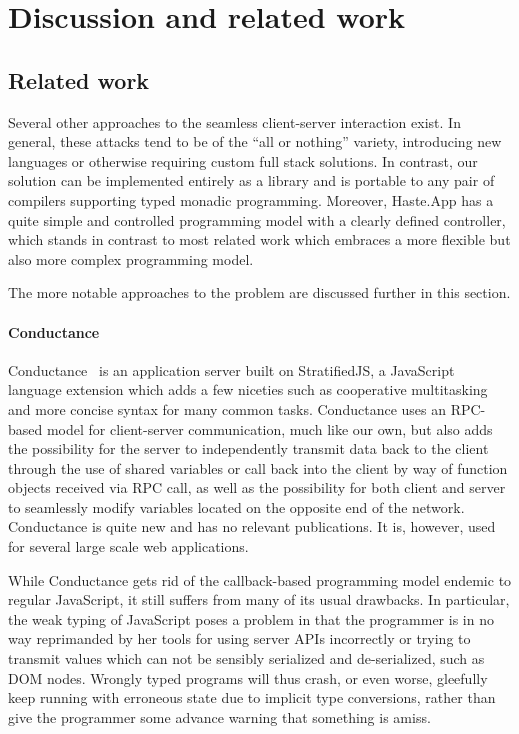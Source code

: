 \documentclass[preprint]{sigplanconf}
\begin{document}
\section{Discussion and related work}

\subsection{Related work}

Several other approaches to the seamless client-server interaction exist. In
general, these attacks tend to be of the ``all or nothing'' variety,
introducing new languages or otherwise requiring custom full stack solutions.
In contrast, our solution can be implemented entirely as a library and is
portable to any pair of compilers supporting typed monadic programming.
Moreover, Haste.App has a quite simple and controlled programming model with a
clearly defined controller, which stands in contrast to most related work which
embraces a more flexible but also more complex programming model.

The more notable approaches to the problem are discussed further in this section.

\paragraph{Conductance} Conductance\ \cite{conductance} is an application
server built on StratifiedJS, a JavaScript language extension which adds a few
niceties such as cooperative multitasking and more concise syntax for many
common tasks.
Conductance uses an RPC-based model for client-server communication, much like
our own, but also adds the possibility for the server to independently transmit
data back to the client through the use of shared variables or call back into
the client by way of function objects received via RPC call, as well as the
possibility for both client and server to seamlessly modify variables located
on the opposite end of the network. Conductance is quite new and has no
relevant publications. It is, however, used for several large scale web
applications.

While Conductance gets rid of the callback-based programming model endemic to
regular JavaScript, it still suffers from many of its usual drawbacks. In
particular, the weak typing of JavaScript poses a problem in that the
programmer is in no way reprimanded by her tools for using server APIs
incorrectly or trying to transmit values which can not be sensibly serialized
and de-serialized, such as DOM nodes. Wrongly typed programs will thus crash, or
even worse, gleefully keep running with erroneous state due to implicit type
conversions, rather than give the programmer some advance warning that something
is amiss.
\end{document}
